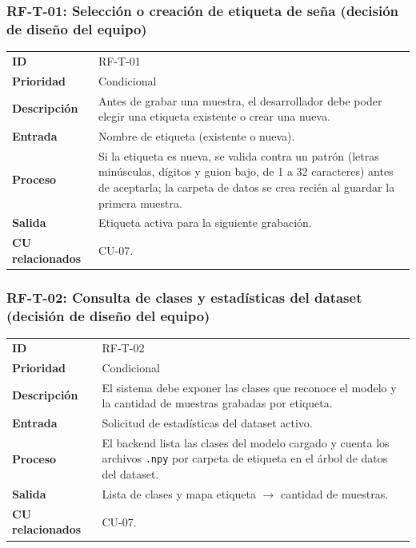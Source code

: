\subsubsection{RF-T-01: Selección o creación de etiqueta de seña (decisión de diseño del equipo)}
\begin{table}[H]
\centering
\begin{tabularx}{\textwidth}{l X}
\toprule
\textbf{ID} & RF-T-01 \\
\textbf{Prioridad} & Condicional \\
\textbf{Descripción} & Antes de grabar una muestra, el desarrollador debe poder elegir una etiqueta existente o crear una nueva. \\
\textbf{Entrada} & Nombre de etiqueta (existente o nueva). \\
\textbf{Proceso} & Si la etiqueta es nueva, se valida contra un patrón (letras minúsculas, dígitos y guion bajo, de 1 a 32 caracteres) antes de aceptarla; la carpeta de datos se crea recién al guardar la primera muestra. \\
\textbf{Salida} & Etiqueta activa para la siguiente grabación. \\
\textbf{CU relacionados} & CU-07. \\
\bottomrule
\end{tabularx}
\end{table}

\subsubsection{RF-T-02: Consulta de clases y estadísticas del dataset (decisión de diseño del equipo)}
\begin{table}[H]
\centering
\begin{tabularx}{\textwidth}{l X}
\toprule
\textbf{ID} & RF-T-02 \\
\textbf{Prioridad} & Condicional \\
\textbf{Descripción} & El sistema debe exponer las clases que reconoce el modelo y la cantidad de muestras grabadas por etiqueta. \\
\textbf{Entrada} & Solicitud de estadísticas del dataset activo. \\
\textbf{Proceso} & El backend lista las clases del modelo cargado y cuenta los archivos \texttt{.npy} por carpeta de etiqueta en el árbol de datos del dataset. \\
\textbf{Salida} & Lista de clases y mapa etiqueta $\rightarrow$ cantidad de muestras. \\
\textbf{CU relacionados} & CU-07. \\
\bottomrule
\end{tabularx}
\end{table}

